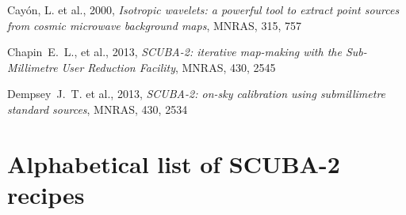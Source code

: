 \documentclass[twoside,11pt,nolof]{starlink}
\begin{document}
\scfrontmatter

\newpage

\newpage

\newpage

\newpage

\newpage

\newpage

\newpage

\newpage

\newpage

\newpage







\begin{thebibliography}{}
 Cay{\'o}n, L. et al., 2000, \textit{Isotropic
    wavelets: a powerful tool to extract point sources from cosmic
    microwave background maps}, MNRAS, 315, 757

Chapin~E.~L., et al., 2013, \textit{SCUBA-2: iterative map-making with
  the Sub-Millimetre User Reduction Facility}, MNRAS, 430, 2545

Dempsey~J.~T. et al., 2013, \textit{SCUBA-2: on-sky calibration using
  submillimetre standard sources}, MNRAS, 430, 2534
\end{thebibliography}

\newpage
\appendix
\section{Alphabetical list of SCUBA-2 recipes\label{ap:list}}
\end{document}
